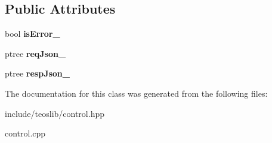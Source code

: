 \subsection*{Public Attributes}
\begin{DoxyCompactItemize}
\item 
\mbox{\label{classteos_1_1_teos_control_ac8e6788b523dcd724c7a424818da7849}} 
bool {\bfseries is\+Error\+\_\+}
\item 
\mbox{\label{classteos_1_1_teos_control_a6122f1a2263a80dacd315739861feac7}} 
ptree {\bfseries req\+Json\+\_\+}
\item 
\mbox{\label{classteos_1_1_teos_control_a1f5268be242e9f6182a083a4d4ec393e}} 
ptree {\bfseries resp\+Json\+\_\+}
\end{DoxyCompactItemize}


The documentation for this class was generated from the following files\+:\begin{DoxyCompactItemize}
\item 
include/teoslib/control.\+hpp\item 
control.\+cpp\end{DoxyCompactItemize}
